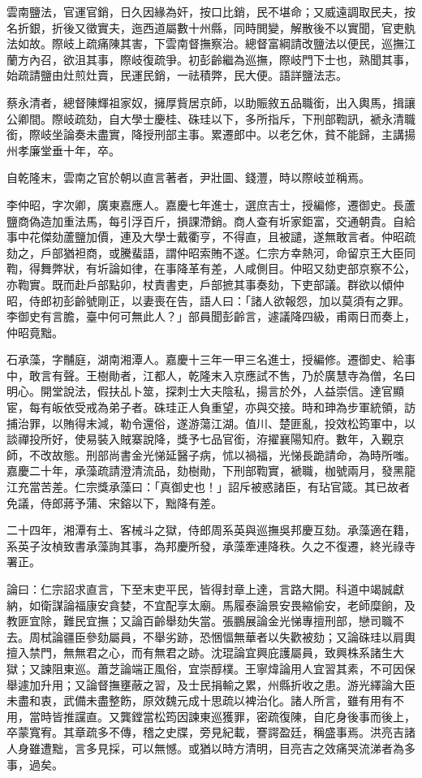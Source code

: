\begin{pinyinscope}
雲南鹽法，官運官銷，日久因緣為奸，按口比銷，民不堪命；又威遠調取民夫，按名折銀，折後又徵實夫，迤西道屬數十州縣，同時閧變，解散後不以實聞，官吏骫法如故。際岐上疏痛陳其害，下雲南督撫察治。總督富綱請改鹽法以便民，巡撫江蘭方內召，欲沮其事，際岐復疏爭。初彭齡繼為巡撫，際岐門下士也，熟聞其事，始疏請鹽由灶煎灶賣，民運民銷，一祛積弊，民大便。語詳鹽法志。

蔡永清者，總督陳輝祖家奴，擁厚貲居京師，以助賑敘五品職銜，出入輿馬，揖讓公卿間。際岐疏劾，自大學士慶桂、硃珪以下，多所指斥，下刑部鞫訊，褫永清職銜，際岐坐論奏未盡實，降授刑部主事。累遷郎中。以老乞休，貧不能歸，主講揚州孝廉堂垂十年，卒。

自乾隆末，雲南之官於朝以直言著者，尹壯圖、錢灃，時以際岐並稱焉。

李仲昭，字次卿，廣東嘉應人。嘉慶七年進士，選庶吉士，授編修，遷御史。長蘆鹽商偽造加重法馬，每引浮百斤，損課滯銷。商人查有圻家鉅富，交通朝貴。自給事中花傑劾蘆鹽加價，連及大學士戴衢亨，不得直，且被譴，遂無敢言者。仲昭疏劾之，戶部猶袒商，或騰蜚語，謂仲昭索賄不遂。仁宗方幸熱河，命留京王大臣同鞫，得舞弊狀，有圻論如律，在事降革有差，人咸側目。仲昭又劾吏部京察不公，亦鞫實。既而赴戶部點卯，杖責書吏，戶部摭其事奏劾，下吏部議。群欲以傾仲昭，侍郎初彭齡號剛正，以妻喪在告，語人曰：「諸人欲報怨，加以莫須有之罪。李御史有言膽，臺中何可無此人？」部員聞彭齡言，遽議降四級，甫兩日而奏上，仲昭竟黜。

石承藻，字黼庭，湖南湘潭人。嘉慶十三年一甲三名進士，授編修。遷御史、給事中，敢言有聲。王樹勛者，江都人，乾隆末入京應試不售，乃於廣慧寺為僧，名曰明心。開堂說法，假扶乩卜筮，探刺士大夫陰私，揚言於外，人益崇信。達官顯宦，每有皈依受戒為弟子者。硃珪正人負重望，亦與交接。時和珅為步軍統領，訪捕治罪，以賄得末減，勒令還俗，遂游蕩江湖。值川、楚匪亂，投效松筠軍中，以談禪投所好，使易裝入賊寨說降，獎予七品官銜，洊擢襄陽知府。數年，入覲京師，不改故態。刑部尚書金光悌延醫子病，怵以禍福，光悌長跪請命，為時所嗤。嘉慶二十年，承藻疏請澄清流品，劾樹勛，下刑部鞫實，褫職，枷號兩月，發黑龍江充當苦差。仁宗獎承藻曰：「真御史也！」詔斥被惑諸臣，有玷官箴。其已故者免議，侍郎蔣予蒲、宋鎔以下，黜降有差。

二十四年，湘潭有土、客械斗之獄，侍郎周系英與巡撫吳邦慶互劾。承藻適在籍，系英子汝楨致書承藻詢其事，為邦慶所發，承藻牽連降秩。久之不復遷，終光祿寺署正。

論曰：仁宗詔求直言，下至末吏平民，皆得封章上達，言路大開。科道中竭誠獻納，如衛謀論福康安貪婪，不宜配享太廟。馬履泰論景安畏縮偷安，老師糜餉，及教匪宜除，難民宜撫；又論百齡舉劾失當。張鵬展論金光悌專擅刑部，戀司職不去。周栻論疆臣參劾屬員，不舉劣跡，恐悃愊無華者以失歡被劾；又論硃珪以肩輿擅入禁門，無無君之心，而有無君之跡。沈琨論宜興庇護屬員，致興株系諸生大獄；又諫阻東巡。蕭芝論端正風俗，宜崇醇樸。王寧煒論用人宜習其素，不可因保舉遽加升用；又論督撫壅蔽之習，及士民捐輸之累，州縣折收之患。游光繹論大臣未盡和衷，武備未盡整飭，原效魏元成十思疏以裨治化。諸人所言，雖有用有不用，當時皆推讜直。又龔鏜當松筠因諫東巡獲罪，密疏復陳，自庀身後事而後上，卒蒙寬宥。其章疏多不傳，稽之史牒，旁見紀載，謇諤盈廷，稱盛事焉。洪亮吉諸人身雖遭黜，言多見採，可以無憾。或猶以時方清明，目亮吉之效痛哭流涕者為多事，過矣。


\end{pinyinscope}